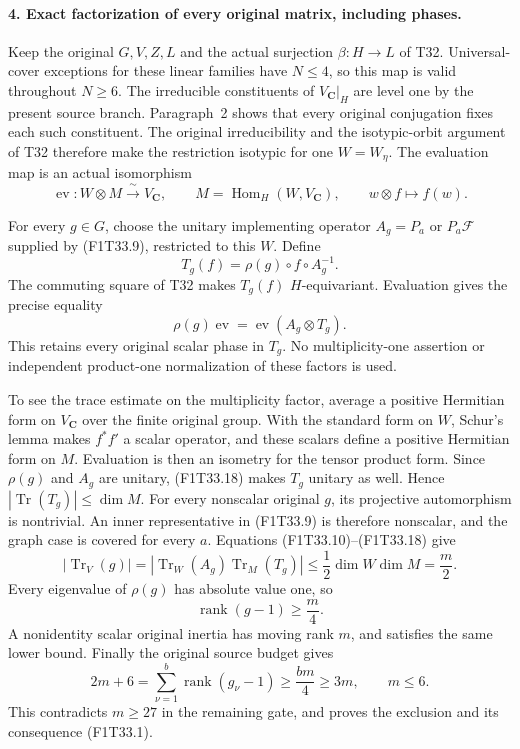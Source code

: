 \paragraph{4. Exact factorization of every original matrix, including phases.}
Keep the original \(G,V,Z,L\) and the actual
surjection \(\beta:H\to L\) of T32. Universal-cover
exceptions for these linear families have \(N\le4\),
so this map is valid throughout \(N\ge6\).
The irreducible constituents of \(V_{\mathbf C}|_H\)
are level one by the present source branch. Paragraph~2
shows that every original conjugation fixes each such
constituent. The original irreducibility and the
isotypic-orbit argument of T32 therefore make the
restriction isotypic for one \(W=W_\eta\).
The evaluation map is an actual isomorphism
\[
 \operatorname{ev}:W\otimes M\xrightarrow{\ \sim\ }
       V_{\mathbf C},\qquad
 M=\operatorname{Hom}_H(W,V_{\mathbf C}),\qquad
 w\otimes f\longmapsto f(w).
 \tag{F1T33.16}
\]

For every \(g\in G\), choose the unitary implementing
operator \(A_g=P_a\) or \(P_a\mathcal F\) supplied
by (F1T33.9), restricted to this \(W\). Define
\[
 T_g(f)=\rho(g)\circ f\circ A_g^{-1}.
 \tag{F1T33.17}
\]
The commuting square of T32 makes \(T_g(f)\)
\(H\)-equivariant. Evaluation gives the precise equality
\[
       \rho(g)\operatorname{ev}
       =\operatorname{ev}(A_g\otimes T_g).
 \tag{F1T33.18}
\]
This retains every original scalar phase in \(T_g\).
No multiplicity-one assertion or independent
product-one normalization of these factors is used.

To see the trace estimate on the multiplicity factor,
average a positive Hermitian form on \(V_{\mathbf C}\)
over the finite original group. With the standard
form on \(W\), Schur's lemma makes
\(f^*f'\) a scalar operator, and these scalars define
a positive Hermitian form on \(M\). Evaluation is
then an isometry for the tensor product form.
Since \(\rho(g)\) and \(A_g\) are unitary,
(F1T33.18) makes \(T_g\) unitary as well. Hence
\(|\operatorname{Tr}(T_g)|\le\dim M\).
For every nonscalar original \(g\), its projective
automorphism is nontrivial. An inner representative
in (F1T33.9) is therefore nonscalar, and the graph
case is covered for every \(a\). Equations
(F1T33.10)--(F1T33.18) give
\[
 |\operatorname{Tr}_V(g)|
 =|\operatorname{Tr}_W(A_g)\operatorname{Tr}_M(T_g)|
 \le\frac12\dim W\dim M=\frac m2.
 \tag{F1T33.19}
\]
Every eigenvalue of \(\rho(g)\) has absolute value
one, so
\[
              \operatorname{rank}(g-1)\ge\frac m4.
 \tag{F1T33.20}
\]
A nonidentity scalar original inertia has moving
rank \(m\), and satisfies the same lower bound.
Finally the original source budget gives
\[
 2m+6=\sum_{\nu=1}^b\operatorname{rank}(g_\nu-1)
          \ge\frac{bm}{4}\ge3m,
 \qquad m\le6.
 \tag{F1T33.21}
\]
This contradicts \(m\ge27\) in the remaining gate,
and proves the exclusion and its consequence
(F1T33.1).

